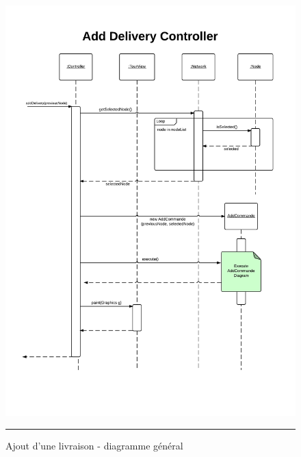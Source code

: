 \begin{figure}[H]
	\centering
		\includegraphics[width=\textwidth,height=\textheight,keepaspectratio]{Figures/ajout_livraison1}
		\rule{35em}{0.5pt}
	\caption[Ajout d'une livraison - diagramme général]{Ajout d'une livraison - diagramme général}
\end{figure}
\clearpage

